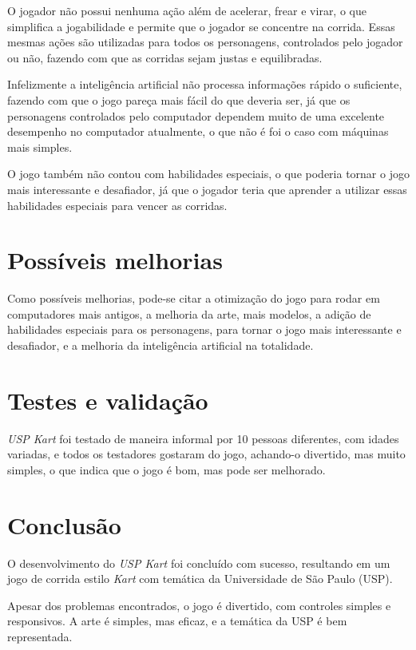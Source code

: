 O jogador não possui nenhuma ação além de acelerar, frear e virar, o que simplifica a jogabilidade e permite que o jogador se concentre na corrida. Essas mesmas ações são utilizadas para todos os personagens, controlados pelo jogador ou não, fazendo com que as corridas sejam justas e equilibradas.

Infelizmente a inteligência artificial não processa informações rápido o suficiente, fazendo com que o jogo pareça mais fácil do que deveria ser, já que os personagens controlados pelo computador dependem muito de uma excelente desempenho no computador atualmente, o que não é foi o caso com máquinas mais simples.

O jogo também não contou com habilidades especiais, o que poderia tornar o jogo mais interessante e desafiador, já que o jogador teria que aprender a utilizar essas habilidades especiais para vencer as corridas.

\section{Possíveis melhorias}

Como possíveis melhorias, pode-se citar a otimização do jogo para rodar em computadores mais antigos, a melhoria da arte, mais modelos, a adição de habilidades especiais para os personagens, para tornar o jogo mais interessante e desafiador, e a melhoria da inteligência artificial na totalidade.

\section{Testes e validação}

\textit{USP Kart} foi testado de maneira informal por 10 pessoas diferentes, com idades variadas, e todos os testadores gostaram do jogo, achando-o divertido, mas muito simples, o que indica que o jogo é bom, mas pode ser melhorado.

\section{Conclusão}

O desenvolvimento do \textit{USP Kart} foi concluído com sucesso, resultando em um jogo de corrida estilo \textit{Kart} com temática da Universidade de São Paulo (USP).

Apesar dos problemas encontrados, o jogo é divertido, com controles simples e responsivos. A arte é simples, mas eficaz, e a temática da USP é bem representada.

